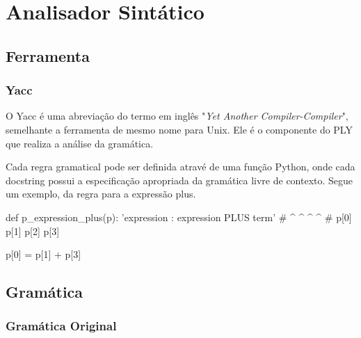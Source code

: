 \documentclass[
	12pt,				%
	openright,			%
	twoside,			%
	a4paper,			%
	english,			%
	french,				%
	spanish,			%
	brazil				%
	]{abntex2}
\begin{document}
\part{Analisador Sintático}
\chapter{Ferramenta}
\section{Yacc}
O Yacc é uma abreviação do termo em inglês "\emph{Yet Another Compiler-Compiler}",
semelhante a ferramenta de mesmo nome para Unix. Ele é o componente do PLY que realiza
a análise da gramática.

Cada regra gramatical pode ser definida atravé de uma função Python, onde cada docstring possui
a especificação apropriada da gramática livre de contexto. Segue um exemplo, da regra para
a expressão plus.

\begin{python}
def p_expression_plus(p):
    'expression : expression PLUS term'
    #   ^            ^        ^    ^
    #  p[0]         p[1]     p[2] p[3]

    p[0] = p[1] + p[3]
\end{python}
\chapter{Gramática}
\section{Gramática Original}
\end{document}
